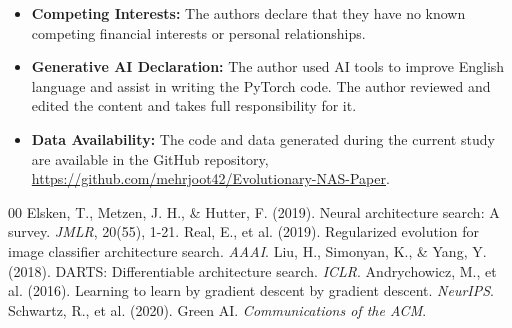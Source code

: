 \documentclass[sn-mathphys]{sn-jnl}%
\begin{document}
\begin{itemize}
\item \textbf{Competing Interests:} The authors declare that they have no known competing financial interests or personal relationships.
\item \textbf{Generative AI Declaration:} The author used AI tools to improve English language and assist in writing the PyTorch code. The author reviewed and edited the content and takes full responsibility for it.
\item \textbf{Data Availability:} The code and data generated during the current study are available in the GitHub repository, \url{https://github.com/mehrjoot42/Evolutionary-NAS-Paper}.
\end{itemize}

\begin{thebibliography}{00}
 Elsken, T., Metzen, J. H., \& Hutter, F. (2019). Neural architecture search: A survey. \textit{JMLR}, 20(55), 1-21.
 Real, E., et al. (2019). Regularized evolution for image classifier architecture search. \textit{AAAI}.
 Liu, H., Simonyan, K., \& Yang, Y. (2018). DARTS: Differentiable architecture search. \textit{ICLR}.
 Andrychowicz, M., et al. (2016). Learning to learn by gradient descent by gradient descent. \textit{NeurIPS}.
 Schwartz, R., et al. (2020). Green AI. \textit{Communications of the ACM}.
\end{thebibliography}
\end{document}
